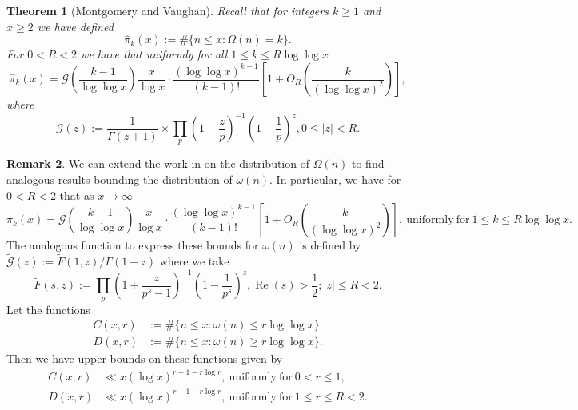 \documentclass[11pt,reqno,a4letter]{article}
\numberwithin{figure}{section}
\numberwithin{table}{section}
\theoremstyle{plain}
\newtheorem{theorem}{Theorem}
\numberwithin{theorem}{section}
\theoremstyle{definition}
\newtheorem{remark}[theorem]{Remark}
\renewcommand{\Re}{\operatorname{Re}}
\begin{document}
\begin{theorem}[Montgomery and Vaughan]
\label{theorem_HatPi_ExtInTermsOfGz} 
Recall that for integers $k \geq 1$ and $x \geq 2$ we have defined 
$$\widehat{\pi}_k(x) := \#\{n \leq x: \Omega(n)=k\}.$$ 
For $0 < R < 2$ we have that uniformly for all $1 \leq k \leq R \log\log x$ 
\[
\widehat{\pi}_k(x) = \mathcal{G}\left(\frac{k-1}{\log\log x}\right) \frac{x}{\log x} \cdot 
     \frac{(\log\log x)^{k-1}}{(k-1)!} \left[1 + O_R\left(\frac{k}{(\log\log x)^2}\right)\right], 
\]
where 
\[
\mathcal{G}(z) := \frac{1}{\Gamma(z+1)} \times 
     \prod_p \left(1-\frac{z}{p}\right)^{-1} \left(1-\frac{1}{p}\right)^z, 0 \leq |z| < R. 
\]
\end{theorem} 

\begin{remark} 
\label{remark_MV_Pikx_FuncResultsAnnotated_v1} 
We can extend the work in \cite{MV} on the distribution of $\Omega(n)$ to find 
analogous results bounding the distribution of $\omega(n)$. In particular, we have 
for $0 < R < 2$ that as $x \rightarrow \infty$ 
\begin{equation}
\label{eqn_Pikx_UniformAsymptoticsStmt_from_MV_v2} 
\pi_k(x) = \widetilde{\mathcal{G}}\left(\frac{k-1}{\log\log x}\right) 
     \frac{x}{\log x} \cdot \frac{(\log\log x)^{k-1}}{(k-1)!} \left[ 
     1 + O_R\left(\frac{k}{(\log\log x)^2}\right) 
     \right], 
     \mathrm{\ uniformly\ for\ } 1 \leq k \leq R\log\log x. 
\end{equation}
The analogous function to express these bounds for $\omega(n)$ is 
defined by $\widetilde{\mathcal{G}}(z) := \widetilde{F}(1, z) / \Gamma(1 + z)$ where 
we take 
\[
\widetilde{F}(s, z) := \prod_p \left(1 + \frac{z}{p^s-1}\right)^{-1} \left(1 - \frac{1}{p^s}\right)^{z}, 
     \Re(s) > \frac{1}{2}; |z| \leq R < 2. 
\]
Let the functions 
\begin{align*} 
C(x, r) & := \#\{n \leq x: \omega(n) \leq r \log\log x\} \\ 
D(x, r) & := \#\{n \leq x: \omega(n) \geq r \log\log x\}. 
\end{align*} 
Then we have upper bounds on these functions given by 
\begin{align*} 
C(x, r) & \ll x (\log x)^{r - 1 - r \log r}, \mathrm{\ uniformly\ for\ } 0 < r \leq 1, \\ 
D(x, r) & \ll x (\log x)^{r - 1 - r \log r}, \mathrm{\ uniformly\ for\ } 1 \leq r \leq R < 2.
\end{align*} 
\end{remark} 
\end{document}
